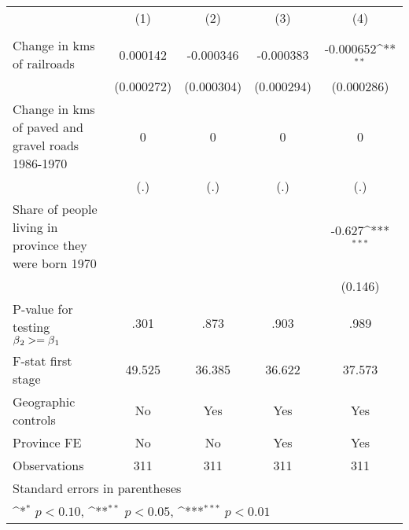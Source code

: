 {
\def\sym#1{\ifmmode^{#1}\else\(^{#1}\)\fi}
\begin{tabular}{l*{4}{c}}
\hline\hline
                &\multicolumn{1}{c}{(1)}&\multicolumn{1}{c}{(2)}&\multicolumn{1}{c}{(3)}&\multicolumn{1}{c}{(4)}\\
                &\multicolumn{1}{c}{}&\multicolumn{1}{c}{}&\multicolumn{1}{c}{}&\multicolumn{1}{c}{}\\
\hline
Change in kms of railroads& 0.000142         &-0.000346         &-0.000383         &-0.000652\sym{**} \\
                &(0.000272)         &(0.000304)         &(0.000294)         &(0.000286)         \\
[1em]
Change in kms of paved and gravel roads 1986-1970&        0         &        0         &        0         &        0         \\
                &      (.)         &      (.)         &      (.)         &      (.)         \\
[1em]
Share of people living in province they were born 1970&                  &                  &                  &   -0.627\sym{***}\\
                &                  &                  &                  &  (0.146)         \\
\hline
P-value for testing $\beta\\_2 >= \beta\\_1$&     .301         &     .873         &     .903         &     .989         \\
F-stat first stage&   49.525         &   36.385         &   36.622         &   37.573         \\
Geographic controls&       No         &      Yes         &      Yes         &      Yes         \\
Province FE     &       No         &       No         &      Yes         &      Yes         \\
Observations    &      311         &      311         &      311         &      311         \\
\hline\hline
\multicolumn{5}{l}{\footnotesize Standard errors in parentheses}\\
\multicolumn{5}{l}{\footnotesize \sym{*} \(p<0.10\), \sym{**} \(p<0.05\), \sym{***} \(p<0.01\)}\\
\end{tabular}
}
